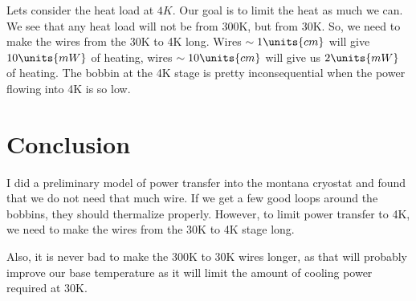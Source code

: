 \documentclass[10pt,twocolumn,aps,rmp,tightenlines,reprint]{revtex4-1}
\begin{document}
Lets consider the heat load at \(4K\).  Our goal is to limit the heat as much 
we can.  We see that any heat load will not be from 300K, but from 30K.  So, we 
need to make the wires from the 30K to 4K long.  Wires \(\sim 1\units{cm}\) will
give \(10 \units{mW}\) of heating, wires \(\sim 10 \units{cm}\) will give us
\(2 \units{mW}\) of heating.  The bobbin at the 4K stage is pretty 
inconsequential when the power flowing into 4K is so low.

\section{Conclusion}
I did a preliminary model of power transfer into the montana cryostat and found
that we do not need that much wire.  If we get a few good loops around the 
bobbins, they should thermalize properly.  However, to limit power transfer to
4K, we need to make the wires from the 30K to 4K stage long.  

Also, it is never bad to make the 300K to 30K wires longer, as that will
probably improve our base temperature as it will limit the amount of cooling
power required at 30K.  
\end{document}
